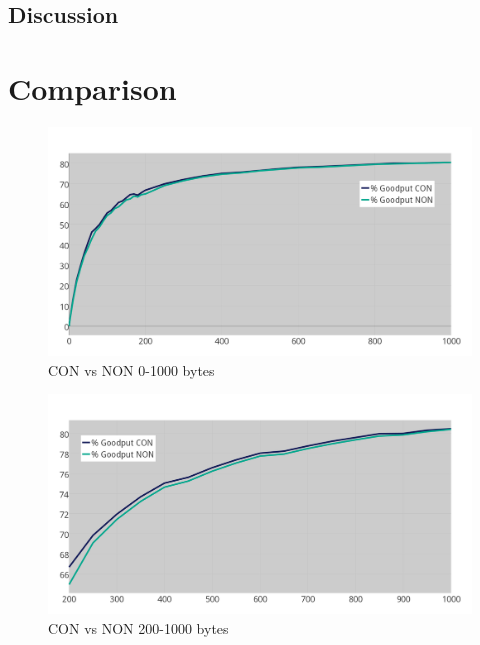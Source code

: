 








\subsection{Discussion}

\section{Comparison}



\begin{figure}[ht]
    \centering
    \includegraphics[scale=1.0]{CONvsNONplot_0-k_thickerGRAY.png}    
    \caption{CON vs NON 0-1000 bytes}
    \label{fig:CONvsNON0-1000}
\end{figure}

\begin{figure}[ht]
    \centering
    \includegraphics[scale=1.0]{CONvsNONplot_200-k_thickerGRAY.png}    
    \caption{CON vs NON 200-1000 bytes}
    \label{fig:CONvsNON200-1000}
\end{figure}

